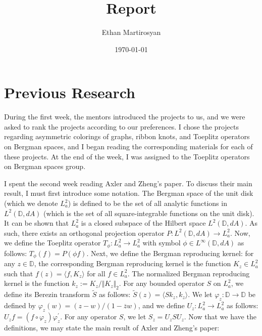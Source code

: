 \documentclass[12pt]{article}
\begin{document}
 
\title{Report}
\author{Ethan Martirosyan}
\date{\today}
\maketitle
{}
\hfuzz=50pt
\section*{Previous Research}
During the first week, the mentors introduced the projects to us, and we were asked to rank the projects according to our preferences. I chose the projects regarding asymmetric colorings of graphs, ribbon knots, and Toeplitz operators on Bergman spaces, and I began reading the corresponding materials for each of these projects. At the end of the week, I was assigned to the Toeplitz operators on Bergman spaces group.
\par I spent the second week reading Axler and Zheng's paper. To discuss their main result, I must first introduce some notation. The Bergman space of the unit disk (which we denote $L_a^2$) is defined to be the set of all analytic functions in $L^2(\mathbb{D},dA)$ (which is the set of all square-integrable functions on the unit disk). It can be shown that $L_a^2$ is a closed subspace of the Hilbert space $L^2(\mathbb{D},dA)$. As such, there exists an orthogonal projection operator $P: L^2(\mathbb{D},dA) \rightarrow L_a^2$. Now, we define the Toeplitz operator $T_\phi: L_a^2 \rightarrow L_a^2$ with symbol $\phi \in L^\infty(\mathbb{D},dA)$ as follows: $T_\phi(f) = P(\phi f)$. Next, we define the Bergman reproducing kernel: for any $z \in \mathbb{D}$, the corresponding Bergman reproducing kernel is the function $K_z \in L_a^2$ such that $f(z) = \langle f, K_z \rangle$ for all $f \in L_a^2$. The normalized Bergman reproducing kernel is the function $k_z := K_z/\Vert K_z \Vert_2$. For any bounded operator $S$ on $L_a^2$, we define its Berezin transform $\tilde{S}$ as follows: $\tilde{S}(z) = \langle Sk_z, k_z \rangle$. We let $\varphi_z: \mathbb{D} \rightarrow \mathbb{D}$ be defined by $\varphi_z(w) = (z-w)/(1-\overline{z}{w})$, and we define $U_z: L_a^2 \rightarrow L_a^2$ as follows: $U_z f = (f \circ \varphi_z)\varphi_z^\prime$. For any operator $S$, we let $S_z = U_z S U_z$. Now that we have the definitions, we may state the main result of Axler and Zheng's paper:
\end{document}
